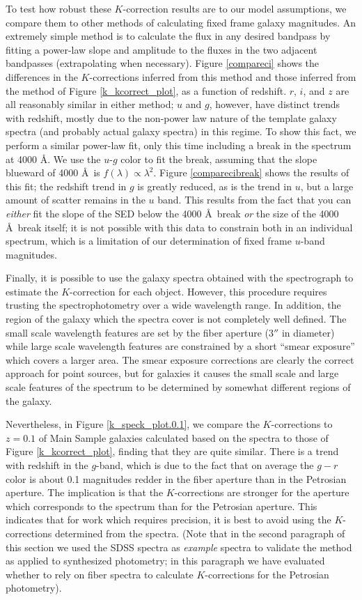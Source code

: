 \documentclass[10pt,preprint]{aastex}
\begin{document}
To test how robust these $K$-correction results are to our model
assumptions, we compare them to other methods of calculating fixed
frame galaxy magnitudes.  An extremely simple method is to calculate
the flux in any desired bandpass by fitting a power-law slope and
amplitude to the fluxes in the two adjacent bandpasses (extrapolating
when necessary). Figure \ref{compareci} shows the differences in
the $K$-corrections inferred from this method and those inferred from
the method of Figure \ref{k_kcorrect_plot}, as a function of
redshift. $r$, $i$, and $z$ are all reasonably similar in either
method; $u$ and $g$, however, have distinct trends with redshift,
mostly due to the non-power law nature of the template galaxy spectra
(and probably actual galaxy spectra) in this regime. To show this
fact, we perform a similar power-law fit, only this time including a
break in the spectrum at 4000 \AA. We use the $u$-$g$ color to fit the
break, assuming that the slope blueward of 4000 \AA\ is
$f(\lambda)\propto \lambda^{2}$.  Figure \ref{comparecibreak} shows
the results of this fit; the redshift trend in $g$ is greatly reduced,
as is the trend in $u$, but a large amount of scatter remains in the
$u$ band. This results from the fact that you can {\it either} fit the
slope of the SED below the 4000 \AA\ break {\it or} the size of the
4000 \AA\ break itself; it is not possible with this data to constrain
both in an individual spectrum, which is a limitation of our
determination of fixed frame $u$-band magnitudes.

Finally, it is possible to use the galaxy spectra obtained with the
spectrograph to estimate the $K$-correction for each object.  However,
this procedure requires trusting the spectrophotometry over a wide
wavelength range. In addition, the region of the galaxy which the
spectra cover is not completely well defined. The small scale
wavelength features are set by the fiber aperture ($3''$ in diameter)
while large scale wavelength features are constrained by a short
``smear exposure'' which covers a larger area. The smear exposure
corrections are clearly the correct approach for point sources, but
for galaxies it causes the small scale and large scale features of the
spectrum to be determined by somewhat different regions of the galaxy.

Nevertheless, in Figure \ref{k_speck_plot.0.1}, we compare the
$K$-corrections to $z=0.1$ of Main Sample galaxies calculated based on
the spectra to those of Figure \ref{k_kcorrect_plot}, finding that
they are quite similar. There is a trend with redshift in the
$g$-band, which is due to the fact that on average the $g-r$ color is
about 0.1 magnitudes redder in the fiber aperture than in the
Petrosian aperture. The implication is that the $K$-corrections are
stronger for the aperture which corresponds to the spectrum than for
the Petrosian aperture. This indicates that for work which requires
precision, it is best to avoid using the $K$-corrections determined
from the spectra. (Note that in the second paragraph of this section
we used the SDSS spectra as {\it example} spectra to validate the
method as applied to synthesized photometry; in this paragraph we have
evaluated whether to rely on fiber spectra to calculate
$K$-corrections for the Petrosian photometry).
\end{document}
